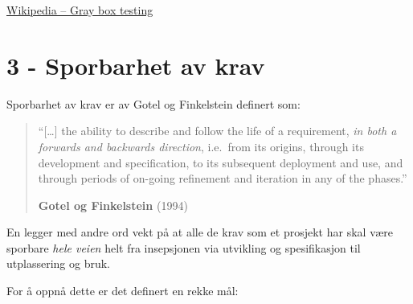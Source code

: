\href{http://en.wikipedia.org/wiki/Gray\_box\_testing}{Wikipedia -- Gray
box testing}

\section{3 - Sporbarhet av krav}

Sporbarhet av krav er av Gotel og Finkelstein definert som:

\begin{quote}
``{[}\ldots{}{]} the ability to describe and follow the life of a
requirement, \emph{in both a forwards and backwards direction},
i.e.~from its origins, through its development and specification, to its
subsequent deployment and use, and through periods of on-going
refinement and iteration in any of the phases.''

\textbf{Gotel og Finkelstein} (1994)

\end{quote}
En legger med andre ord vekt på at alle de krav som et prosjekt har skal
være sporbare \emph{hele veien} helt fra insepsjonen via utvikling og
spesifikasjon til utplassering og bruk.

For å oppnå dette er det definert en rekke mål:

